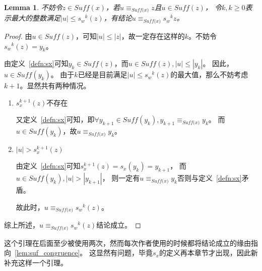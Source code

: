 \documentclass[UTF8]{ctexart}
\newtheorem{lem}[thm]{Lemma}
\theoremstyle{definition}
\theoremstyle{remark}
\numberwithin{equation}{subsection}
\newcommand{\equsuf}[1][x]{\equiv_{\textit{Suff(#1)}}}
\newcommand{\Suff}{\textit{Suff}}
\begin{document}
	\begin{lem}
	\label{lem:sx_k_equsuf_u}
		不妨令$z \in \Suff(x)$，若$u \equsuf z$且$u \in \Suff(z)$，
		令$k, k \ge 0$表示最大的整数满足$|u| \le {s_w}^k(z)$，有结论$u \equsuf {s_w}^k{z}$。
	\end{lem}
	\begin{proof}
		由$u \in \Suff(z)$，可知$|u| \le |z|$，故一定存在这样的$k$。不妨令${s_w}^k(z) = y_k$。
		
		由定义~\ref{defn:sx}可知$y_k \in \Suff(z)$，而$u \in \Suff(z), |u| \le |y_k|$。
		因此，$u \in \Suff(y_k)$。
		由于$k$已经是目前满足$|u| \le {s_w}^k(z)$的最大值，那么不妨考虑$k+1$。显然共有两种情况。
		\begin{enumerate}[(1)]
			\item $s_x^{k+1}(z)$不存在
			
			又定义~\ref{defn:sx}可知，即$\forall y_{k+1} \in \Suff(y_k), y_{k+1} \equsuf[x] y_k$。
			而$u \in \Suff(y_k)$，故$u \equsuf[x] y_k$。
			
			\item $|u| > s_x^{k+1}(z)$
			
			由定义~\ref{defn:sx}可知$s_x^{k+1}(z) = s_x(y_k) = y_{k+1}$，
			而$u \in \Suff(y_k), |u| > |y_{k+1}|$，
			则一定有$u \equsuf[x] y_k$否则与定义~\ref{defn:sx}矛盾。
			
			故此时，$u \equsuf[x] {s_w}^k(z)$。
			
		\end{enumerate}
		综上所述，$u \equsuf[x] {s_w}^k(z)$结论成立。
	\end{proof}
	这个引理在后面至少被使用两次，然而每次作者使用的时候都将结论成立的缘由指向~\ref{lem:suf_congruence}。
	这显然有问题，毕竟$s_x$的定义再本章节才出现，因此新补充这样一个引理。
	
\end{document}
